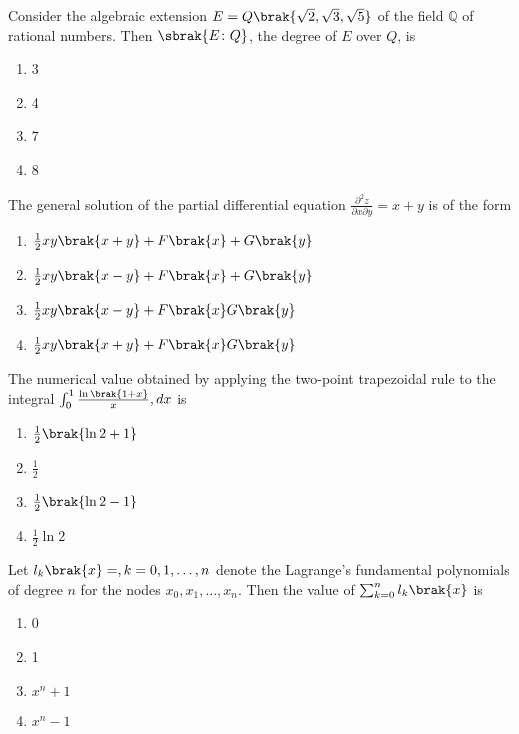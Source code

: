 \item Consider the algebraic extension $E = Q \brak{\sqrt{2}, \sqrt{3}, \sqrt{5}}$ of the field $\mathbb{Q}$ of rational numbers. Then $\sbrak{E \colon Q}$, the degree of $E$ over $Q$, is
\begin{multicols}{2}
    \begin{enumerate}
        \item 3
        \item 4
        \item 7
        \item 8
    \end{enumerate}
\end{multicols}

\item The general solution of the partial differential equation $\frac{\partial^2 z}{\partial x \partial y} = x + y$ is of the form
\begin{multicols}{2}
    \begin{enumerate}
        \item $\frac{1}{2} xy \brak{x+y} + F\brak{x} + G\brak{y}$
        \item $\frac{1}{2} xy \brak{x-y} + F\brak{x} + G\brak{y}$
        \item $\frac{1}{2} xy \brak{x-y} + F\brak{x} G\brak{y}$
        \item $\frac{1}{2} xy \brak{x+y} + F\brak{x} G\brak{y}$
    \end{enumerate}
\end{multicols}

\item The numerical value obtained by applying the two-point trapezoidal rule to the integral $\int_0^1 \frac{\ln{\brak{1+x}}}{x}, dx$ is
\begin{multicols}{2}
    \begin{enumerate}
        \item $\frac{1}{2} \brak{\ln{2}+1}$
        \item $\frac{1}{2}$
        \item $\frac{1}{2} \brak{\ln{2}-1}$
        \item $\frac{1}{2} \ln{2}$
    \end{enumerate}
\end{multicols}

\item Let $l_k \brak{x} =, k =0,1, \dots , n$ denote the Lagrange's fundamental polynomials of degree $n$ for the nodes $x_0, x_1, \dots , x_n$. Then the value of $\sum_{k=0}^{n} l_k \brak{x}$ is
\begin{multicols}{2}
    \begin{enumerate}
        \item 0
        \item 1
        \item $x^n + 1$
        \item $x^n - 1$
    \end{enumerate}
\end{multicols}

